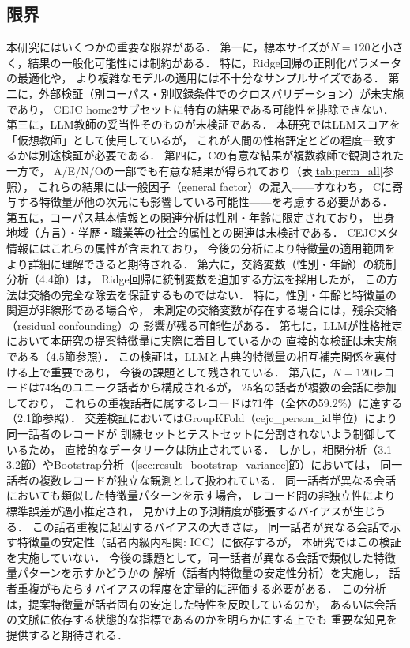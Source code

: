 \documentclass[dvipdfmx,11pt,a4paper]{bxjsarticle}
\begin{document}
\subsection{限界}

本研究にはいくつかの重要な限界がある．
第一に，標本サイズが$N = 120$と小さく，結果の一般化可能性には制約がある．
特に，Ridge回帰の正則化パラメータの最適化や，
より複雑なモデルの適用には不十分なサンプルサイズである．
第二に，外部検証（別コーパス・別収録条件でのクロスバリデーション）が未実施であり，
CEJC home2サブセットに特有の結果である可能性を排除できない．
第三に，LLM教師の妥当性そのものが未検証である．
本研究ではLLMスコアを「仮想教師」として使用しているが，
これが人間の性格評定とどの程度一致するかは別途検証が必要である．
第四に，Cの有意な結果が複数教師で観測された一方で，
A/E/N/Oの一部でも有意な結果が得られており（表\ref{tab:perm_all}参照），
これらの結果には一般因子（general factor）の混入——すなわち，
Cに寄与する特徴量が他の次元にも影響している可能性——を考慮する必要がある．
第五に，コーパス基本情報との関連分析は性別・年齢に限定されており，
出身地域（方言）・学歴・職業等の社会的属性との関連は未検討である．
CEJCメタ情報にはこれらの属性が含まれており，
今後の分析により特徴量の適用範囲をより詳細に理解できると期待される．
第六に，交絡変数（性別・年齢）の統制分析（4.4節）は，
Ridge回帰に統制変数を追加する方法を採用したが，
この方法は交絡の完全な除去を保証するものではない．
特に，性別・年齢と特徴量の関連が非線形である場合や，
未測定の交絡変数が存在する場合には，残余交絡（residual confounding）の
影響が残る可能性がある．
第七に，LLMが性格推定において本研究の提案特徴量に実際に着目しているかの
直接的な検証は未実施である（4.5節参照）．
この検証は，LLMと古典的特徴量の相互補完関係を裏付ける上で重要であり，
今後の課題として残されている．
第八に，$N = 120$レコードは74名のユニーク話者から構成されるが，
25名の話者が複数の会話に参加しており，
これらの重複話者に属するレコードは71件（全体の59.2\%）に達する（2.1節参照）．
交差検証においてはGroupKFold（cejc\_person\_id単位）により同一話者のレコードが
訓練セットとテストセットに分割されないよう制御しているため，
直接的なデータリークは防止されている．
しかし，相関分析（3.1--3.2節）やBootstrap分析（\ref{sec:result_bootstrap_variance}節）においては，
同一話者の複数レコードが独立な観測として扱われている．
同一話者が異なる会話においても類似した特徴量パターンを示す場合，
レコード間の非独立性により標準誤差が過小推定され，
見かけ上の予測精度が膨張するバイアスが生じうる．
この話者重複に起因するバイアスの大きさは，
同一話者が異なる会話で示す特徴量の安定性（話者内級内相関: ICC）に依存するが，
本研究ではこの検証を実施していない．
今後の課題として，同一話者が異なる会話で類似した特徴量パターンを示すかどうかの
解析（話者内特徴量の安定性分析）を実施し，
話者重複がもたらすバイアスの程度を定量的に評価する必要がある．
この分析は，提案特徴量が話者固有の安定した特性を反映しているのか，
あるいは会話の文脈に依存する状態的な指標であるのかを明らかにする上でも
重要な知見を提供すると期待される．
\end{document}
